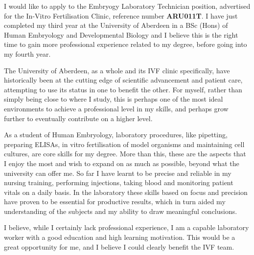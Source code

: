 \documentclass[paper=a4,fontsize=11pt]{scrartcl} %
\newcommand{\sepspace}{\vspace*{1em}}		%
\begin{document}

  \cleardoublepage

  \sepspace
  
    \noindent
    I would like to apply to the Embryogy Laboratory Technician position,
    advertised for the In-Vitro Fertilisation Clinic, reference number
    \textbf{ARU011T}. I have just completed my third year at the University of
    Aberdeen in a BSc (Hons) of Human Embryology and Developmental Biology and
    I believe this is the right time to gain more professional experience
    related to my degree, before going into my fourth year.  \sepspace
    
    
    \noindent The University of Aberdeen, as a whole and its IVF clinic
    specifically, have historically been at the cutting edge of scientific
    advancement and patient care, attempting to use its status in one to
    benefit the other. For myself, rather than simply being close to where I
    study, this is perhaps one of the most ideal environments to achieve a
    professional level in my skills, and perhaps grow further to eventually
    contribute on a higher level.  \sepspace
    
    
    \noindent As a student of Human Embryology, laboratory procedures, like
    pipetting, preparing ELISAs, in vitro fertilisation of model organisms and
    maintaining cell cultures, are core skills for my degree. More than this,
    these are the aspects that I enjoy the most and wish to expand on as much
    as possible, beyond what the university can offer me. So far I have learnt
    to be precise and reliable in my nursing training, performing injections,
    taking blood and monitoring patient vitals on a daily basis. In the
    laboratory these skills based on focus and precision have proven to be
    essential for productive results, which in turn aided my understanding of
    the subjects and my ability to draw meaningful conclusions.  \sepspace
    
    
    \noindent
    I believe, while I certainly lack professional experience, I am a capable laboratory worker with a good education and high learning motivation. This would be a great opportunity for me, and I believe I could clearly benefit the IVF team.

  
  
\end{document}

